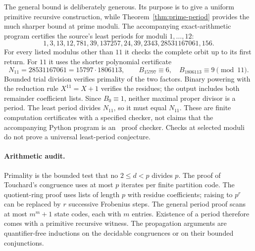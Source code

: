 The general bound is deliberately generous. Its purpose is to give a
uniform primitive recursive construction, while
Theorem~\ref{thm:prime-period} provides the much sharper bound at prime
moduli. The accompanying exact-arithmetic program certifies the source's
least periods for moduli $1,\ldots,12$:
\[
 1,3,13,12,781,39,137257,24,39,2343,28531167061,156.
\]
For every listed modulus other than $11$ it checks the complete orbit up to
its first return. For $11$ it uses the shorter polynomial certificate
\[
 N_{11}=28531167061=15797\cdot1806113,
 \qquad B_{15797}\equiv6,\quad B_{1806113}\equiv9\pmod{11}.
\]
Bounded trial division verifies primality of the two factors. Binary powering
with the reduction rule $X^{11}=X+1$ verifies the residues; the output includes
both remainder coefficient lists. Since $B_0\equiv1$, neither maximal proper
divisor is a period. The least period divides $N_{11}$, so it must equal
$N_{11}$. These are finite computation certificates with a specified checker,
not claims that the accompanying Python program is an \ipra\ proof checker.
Checks at selected moduli do not prove a universal least-period conjecture.

\paragraph{Arithmetic audit.}
Primality is the bounded test that no $2\leq d<p$ divides $p$. The proof of
Touchard's congruence uses at most $p$ iterates per finite partition code.
The quotient-ring proof uses lists of length $p$ with residue coefficients;
raising to $p^r$ can be replaced by $r$ successive Frobenius steps.
The general period proof scans at most $m^m+1$ state codes, each with $m$
entries. Existence of a period therefore comes with a primitive recursive
witness. The propagation arguments are quantifier-free inductions on the
decidable congruences or on their bounded conjunctions.
